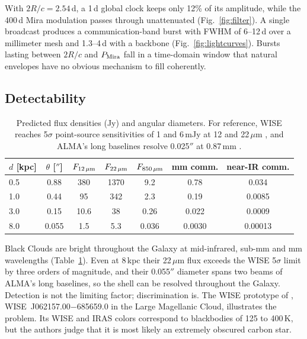 \documentclass[final,5p]{elsarticle}
\newenvironment{widetable}{\begin{table}[t]}{\end{table}}
\newenvironment{widetable}{\begin{table}[t]}{\end{table}}
\begin{document}
With $2R/c=2.54$\,d, a 1\,d global clock keeps only 12\% of its amplitude, while the 400\,d Mira modulation passes through unattenuated (Fig.~\ref{fig:filter}). A single broadcast produces a communication-band burst with FWHM of 6--12\,d over a millimeter mesh and 1.3--4\,d with a backbone (Fig.~\ref{fig:lightcurves}). Bursts lasting between $2R/c$ and $P_{\rm Mira}$ fall in a time-domain window that natural envelopes have no obvious mechanism to fill coherently.

\subsection{Detectability}

\begin{widetable}
\centering
\caption{Predicted flux densities (Jy) and angular diameters. For reference, WISE reaches 5$\sigma$ point-source sensitivities of 1 and 6\,mJy at 12 and 22\,$\mu$m \citep{Wright2010}, and ALMA's long baselines resolve 0.025$''$ at 0.87\,mm \citep{ALMA2015}.}
\label{tab:det}
\small
\begin{tabular}{lcccccc}
\toprule
$d$ [kpc] & $\theta$ [$''$] & $F_{12\,\mu{\rm m}}$ & $F_{22\,\mu{\rm m}}$ & $F_{850\,\mu{\rm m}}$ & mm comm. & near-IR comm. \\
\midrule
0.5 & 0.88  & 380  & 1370 & 9.2   & 0.78  & 0.034 \\
1.0 & 0.44  & 95   & 342  & 2.3   & 0.19 & 0.0085 \\
3.0 & 0.15  & 10.6 & 38   & 0.26  & 0.022 & 0.0009 \\
8.0 & 0.055 & 1.5  & 5.3  & 0.036 & 0.0030 & 0.00013 \\
\bottomrule
\end{tabular}
\end{widetable}

Black Clouds are bright throughout the Galaxy at mid-infrared, sub-mm and mm wavelengths (Table~\ref{tab:det}). Even at 8\,kpc their 22\,$\mu$m flux exceeds the WISE 5$\sigma$ limit by three orders of magnitude, and their 0.055$''$ diameter spans two beams of ALMA's long baselines, so the shell can be resolved throughout the Galaxy. Detection is not the limiting factor; discrimination is. The WISE prototype of \citet{LaughlinAdams2021}, WISE~J062157.00$-$685659.0 in the Large Magellanic Cloud, illustrates the problem. Its WISE and IRAS colors correspond to blackbodies of 125 to 400\,K, but the authors judge that it is most likely an extremely obscured carbon star.

\end{document}
